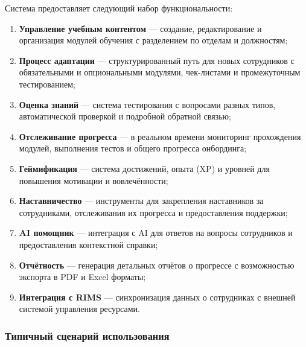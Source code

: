 Система предоставляет следующий набор функциональности:

\begin{enumerate}
    \item \textbf{Управление учебным контентом} --- создание, редактирование и организация модулей обучения с разделением по отделам и должностям;
    
    \item \textbf{Процесс адаптации} --- структурированный путь для новых сотрудников с обязательными и опциональными модулями, чек-листами и промежуточным тестированием;
    
    \item \textbf{Оценка знаний} --- система тестирования с вопросами разных типов, автоматической проверкой и подробной обратной связью;
    
    \item \textbf{Отслеживание прогресса} --- в реальном времени мониторинг прохождения модулей, выполнения тестов и общего прогресса онбординга;
    
    \item \textbf{Геймификация} --- система достижений, опыта (XP) и уровней для повышения мотивации и вовлечённости;
    
    \item \textbf{Наставничество} --- инструменты для закрепления наставников за сотрудниками, отслеживания их прогресса и предоставления поддержки;
    
    \item \textbf{AI помощник} --- интеграция с AI для ответов на вопросы сотрудников и предоставления контекстной справки;
    
    \item \textbf{Отчётность} --- генерация детальных отчётов о прогрессе с возможностью экспорта в PDF и Excel форматы;
    
    \item \textbf{Интеграция с RIMS} --- синхронизация данных о сотрудниках с внешней системой управления ресурсами.
\end{enumerate}


\subsubsection*{Типичный сценарий использования}

